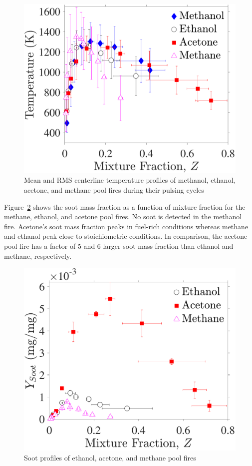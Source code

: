 \documentclass[preprint,review,12pt]{elsarticle}
\begin{document}
\begin{figure}[h!]
	\centering
\includegraphics[width=6.7 cm,keepaspectratio]{Temperature_Comparison.pdf}
	\caption[Mean and RMS centerline temperature profiles]{Mean and RMS centerline temperature profiles of methanol, ethanol, acetone, and methane pool fires during their pulsing cycles}
	\label{fig:Temp_Comparison}
\end{figure}
Figure~\ref{fig:Soot_Comparison} shows the soot mass fraction as a function of mixture fraction for the methane, ethanol, and acetone pool fires. No soot is detected in the methanol fire. Acetone's soot mass fraction peaks in fuel-rich conditions whereas methane and ethanol peak close to stoichiometric conditions. In comparison, the acetone pool fire has a factor of 5 and 6 larger soot mass fraction than ethanol and methane, respectively.
\begin{figure}[h!]
	\centering
\includegraphics[width=6.7 cm,keepaspectratio]{Soot.pdf}
	\caption[Soot Mass Fraction profiles]{Soot profiles of ethanol, acetone, and methane pool fires}
	\label{fig:Soot_Comparison}
\end{figure}
\end{document}
